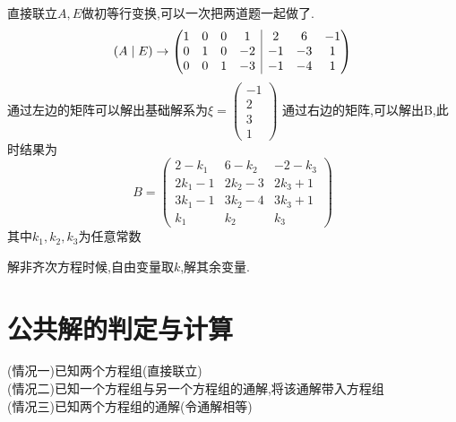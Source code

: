 \documentclass[12pt, a4paper, oneside, UTF8]{ctexbook}
\begin{document}
\begin{enumerate}
    \begin{solution}
    直接联立$A,E$做初等行变换,可以一次把两道题一起做了. 
    $$
    (A\mid E) \rightarrow \left(
        \begin{array}{@{}c|c@{}}
        \begin{matrix}
            1 & 0 & 0 & 1 \\
            0 & 1 & 0 & -2 \\
            0 & 0 & 1 & -3
        \end{matrix} &
        \begin{matrix}
            2 & 6 & -1 \\
            -1 & -3 & 1 \\
            -1 & -4 & 1
        \end{matrix}
        \end{array}
        \right)
    $$
    通过左边的矩阵可以解出基础解系为$\xi=\begin{pmatrix}
        -1 \\
        2 \\
        3 \\
        1
    \end{pmatrix}$ 通过右边的矩阵,可以解出B,此时结果为 
    $$
    B = \begin{pmatrix}
        2-k_1 & 6 - k_2 & -2-k_3 \\
        2k_1-1 & 2k_2-3 & 2k_3+1 \\
        3k_1-1 & 3k_2-4 & 3k_3+1 \\
        k_1 & k_2 & k_3 
    \end{pmatrix}
    $$
    其中$k_1,k_2,k_3$为任意常数
    \end{solution}
    \begin{remark}[分块矩阵解矩阵方程的注意点]
        解非齐次方程时候,自由变量取$k$,解其余变量.
    \end{remark}
\end{enumerate}

\section{公共解的判定与计算}
\begin{remark}[公共解的三种情况]
    (情况一)已知两个方程组(直接联立) \\
    (情况二)已知一个方程组与另一个方程组的通解,将该通解带入方程组 \\
    (情况三)已知两个方程组的通解(令通解相等) 
\end{remark}
\end{document}
